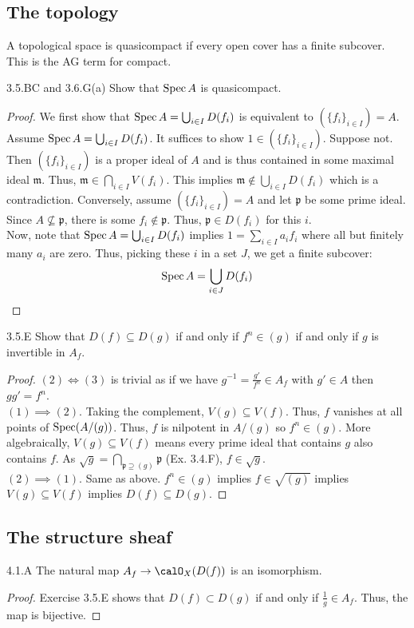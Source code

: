 \documentclass[12pt]{article}
\begin{document}
\subsection{The topology}
\begin{definition}
    A topological space is quasicompact if every open cover has a finite subcover. This is the AG term for compact.
\end{definition}
\begin{exercise}{3.5.BC and 3.6.G(a)}
    Show that $\operatorname{Spec} A$ is quasicompact. 
\end{exercise}
\begin{proof}
    We first show that $\operatorname{Spec} A = \bigcup_{i \in I} D(f_i)$ is equivalent to $(\{f_i\}_{i \in I}) = A$. \\
    Assume $\operatorname{Spec} A = \bigcup_{i \in I} D(f_i)$. It suffices to show $1 \in (\{f_i\}_{i \in I})$. Suppose not. Then $(\{f_i\}_{i \in I})$ is a proper ideal of $A$ and is thus contained in some maximal ideal $\mathfrak{m}$. Thus, $\mathfrak{m} \in \bigcap_{i\in I} V(f_i)$. This implies $\mathfrak{m} \not \in \bigcup_{i \in I} D(f_i)$ which is a contradiction. Conversely, assume $(\{f_i\}_{i \in I}) = A$ and let $\mathfrak p$ be some prime ideal. Since $A \not \subseteq \mathfrak p$, there is some $f_i \not \in \mathfrak p$. Thus, $\mathfrak p \in D(f_i)$ for this $i$. \\ 
    Now, note that $\operatorname{Spec} A = \bigcup_{i \in I} D(f_i)$ implies $1 = \sum_{i \in I} a_if_i$ where all but finitely many $a_i$ are zero. Thus, picking these $i$ in a set $J$, we get a finite subcover:
    \[ \operatorname{Spec} A = \bigcup_{i\in J} D(f_i)\]
\end{proof}

\begin{exercise}{3.5.E}
    Show that $D(f) \subseteq D(g)$ if and only if $f^n \in (g)$ if and only if $g$ is invertible in $A_f$. 
\end{exercise}
\begin{proof}
    $(2) \iff (3)$ is trivial as if we have $g^{-1} = \frac{g'}{f^n} \in A_f$ with $g' \in A$ then $gg' = f^n$. \\
    $(1) \implies (2)$. Taking the complement, $V(g) \subseteq V(f)$. Thus, $f$ vanishes at all points of $\operatorname{Spec}(A/(g))$. Thus, $f$ is nilpotent in $A/(g)$ so $f^n \in (g)$. More algebraically, $V(g) \subseteq V(f)$ means every prime ideal that contains $g$ also contains $f$. As $\sqrt{g} = \bigcap_{\mathfrak{p}\supseteq (g)} \mathfrak{p}$ (Ex. 3.4.F), $f \in \sqrt{g}$. \\
    $(2) \implies (1)$. Same as above. $f^n \in (g)$ implies $f \in \sqrt{(g)}$ implies $V(g) \subseteq V(f)$ implies $D(f) \subseteq D(g)$.  
\end{proof}


\subsection{The structure sheaf}

\begin{exercise}{4.1.A}
    The natural map $A_f \to \calO_X(D(f))$ is an isomorphism.    
\end{exercise}
\begin{proof}
    Exercise 3.5.E shows that $D(f) \subset D(g)$ if and only if $\frac{1}{g} \in A_f$. Thus, the map is bijective.
\end{proof}
\end{document}
